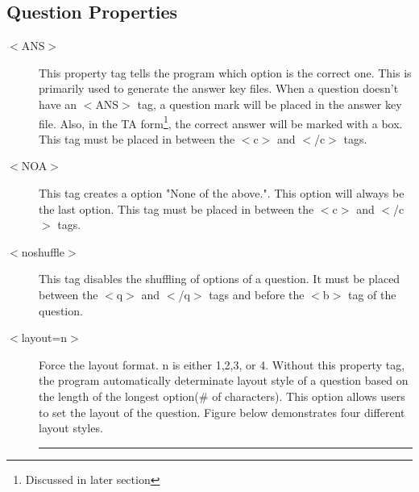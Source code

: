 \documentclass[11pt,letterpaper]{article}
\begin{document}
\subsection{Question Properties}

\begin{description}
    \item[$<$ANS$>$] This property tag tells the program which option is the correct one. This is primarily used to generate the answer key files. When a question doesn't have an $<$ANS$>$ tag, a question mark will be placed in the answer key file. Also, in the TA form\footnote{Discussed in later section}, the correct answer will be marked with a box. This tag must be placed in between the $<$c$>$ and $<$/c$>$ tags. 

    \item[$<$NOA$>$] This tag creates a option "None of the above.". This option will always be the last option. This tag must be placed in between the $<$c$>$ and $<$/c$>$ tags. 

    \item[$<$noshuffle$>$] This tag disables the shuffling of options of a question. It must be placed between the $<$q$>$ and $<$/q$>$ tags and before the $<$b$>$ tag of the question. 

    \item[$<$layout=n$>$] Force the layout format. n is either 1,2,3, or 4. Without this property tag, the program automatically determinate layout style of a question based on the length of the longest option(\# of characters). This option allows users to set the layout of the question. Figure below demonstrates four different layout styles. 


\hspace{-0.65in}\rule{7in}{0.02in}
\begin{enumerate}
\setlength{\itemsep}{0pt}
\setlength{\parskip}{0pt}
\setlength{\parsep}{0pt}




\end{enumerate}
\end{description}
\end{document}
